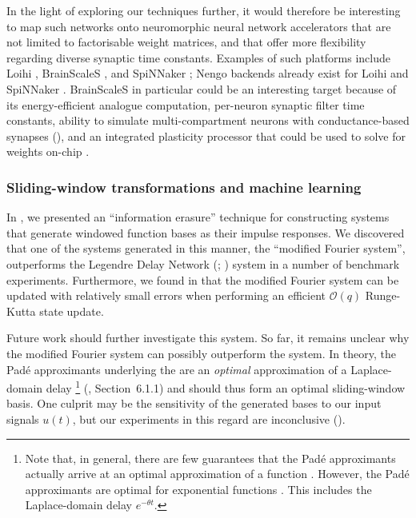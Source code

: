 In the light of exploring our techniques further, it would therefore be interesting to map such networks onto neuromorphic neural network accelerators that are not limited to factorisable weight matrices, and that offer more flexibility regarding diverse synaptic time constants.
Examples of such platforms include Loihi \citep{davies2018loihi}, BrainScaleS \citep{schemmel2010waferscale}, and SpiNNaker \citep{painkras2013spinnaker}; Nengo backends already exist for Loihi and SpiNNaker \citep{mundy2015efficient,blouw2019benchmarking}.
BrainScaleS in particular could be an interesting target because of its energy-efficient analogue computation, per-neuron synaptic filter time constants, ability to simulate multi-compartment \LIF neurons with conductance-based synapses (), and an integrated plasticity processor that could be used to solve for weights on-chip \citep{friedmann2017demonstrating}.

\subsubsection{Sliding-window transformations and machine learning}

In , we presented an \enquote{information erasure} technique for constructing \LTI systems that generate windowed function bases as their impulse responses.
We discovered that one of the systems generated in this manner, the \enquote{modified Fourier system}, outperforms the Legendre Delay Network (\LDN; \cite{voelker2018improving}) system in a number of benchmark experiments.
Furthermore, we found in  that the modified Fourier system can be updated with relatively small errors when performing an efficient $\mathcal{O}(q)$ Runge-Kutta state update.

Future work should further investigate this system.
So far, it remains unclear why the modified Fourier system can possibly outperform the \LDN system.
In theory, the Padé approximants underlying the \LDN are an \emph{optimal} approximation of a Laplace-domain delay%
\footnote{Note that, in general, there are few guarantees that the Padé approximants actually arrive at an optimal approximation of a function \citep[Section~5.12]{press2007numerical}. However, the Padé approximants are optimal for exponential functions \citep{borwein1983pade}.
This includes the Laplace-domain delay $e^{-\theta t}$.}
(\cite{voelker2019}, Section~6.1.1) and should thus form an optimal sliding-window basis.
One culprit may be the sensitivity of the generated bases to our input signals $u(t)$, but our experiments in this regard are inconclusive ().

